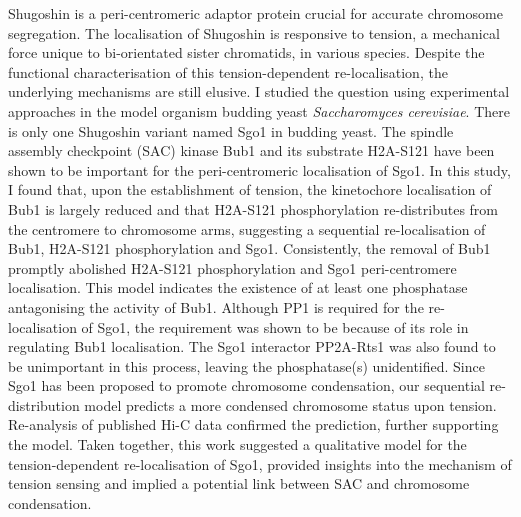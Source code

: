 {Shugoshin is a peri-centromeric adaptor protein crucial for accurate chromosome segregation. The localisation of Shugoshin is responsive to tension, a mechanical force unique to bi-orientated sister chromatids, in various species. Despite the functional characterisation of this tension-dependent re-localisation, the underlying mechanisms are still elusive. I studied the question using experimental approaches in the model organism budding yeast \textit{Saccharomyces cerevisiae}. There is only one Shugoshin variant named Sgo1 in budding yeast. The spindle assembly checkpoint (SAC) kinase Bub1 and its substrate H2A-S121 have been shown to be important for the peri-centromeric localisation of Sgo1. In this study, I found that, upon the establishment of tension, the kinetochore localisation of Bub1 is largely reduced and that H2A-S121 phosphorylation re-distributes from the centromere to chromosome arms, suggesting a sequential re-localisation of Bub1, H2A-S121 phosphorylation and Sgo1. Consistently, the removal of Bub1 promptly abolished H2A-S121 phosphorylation and Sgo1 peri-centromere localisation. This model indicates the existence of at least one phosphatase antagonising the activity of Bub1. Although PP1 is required for the re-localisation of Sgo1, the requirement was shown to be because of its role in regulating Bub1 localisation. The Sgo1 interactor PP2A-Rts1 was also found to be unimportant in this process, leaving the phosphatase(s) unidentified. Since Sgo1 has been proposed to promote chromosome condensation, our sequential re-distribution model predicts a more condensed chromosome status upon tension. Re-analysis of published Hi-C data confirmed the prediction, further supporting the model. Taken together, this work suggested a qualitative model for the tension-dependent re-localisation of Sgo1, provided insights into the mechanism of tension sensing and implied a potential link between SAC and chromosome condensation. 
}

